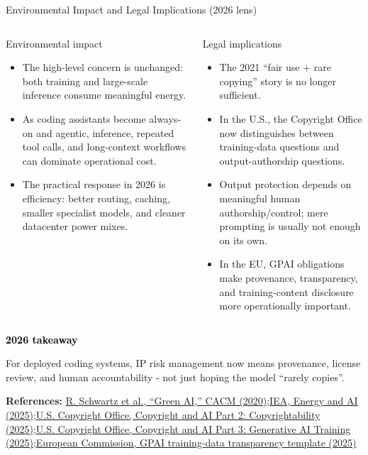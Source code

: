 \documentclass[aspectratio=43,9pt]{beamer}
\newcommand{\srclink}[2]{\href{#2}{\textcolor{black!68}{#1}}}
\newcommand{\sep}{;\hspace{0.35em}}
\newcommand{\refline}[2][References]{%
  \vfill
  {\raggedright\fontsize{5.1}{5.5}\selectfont\color{black!68}\textbf{#1:} #2\par}%
}
\newcommand{\srcSchwartz}{\srclink{R. Schwartz et al., ``Green AI,'' CACM (2020)}{https://arxiv.org/abs/1907.10597}}
\newcommand{\srcIEA}{\srclink{IEA, Energy and AI (2025)}{https://www.iea.org/reports/energy-and-ai/}}
\newcommand{\srcUSCOPTwo}{\srclink{U.S. Copyright Office, Copyright and AI Part 2: Copyrightability (2025)}{https://www.copyright.gov/ai/Copyright-and-Artificial-Intelligence-Part-2-Copyrightability-Report.pdf}}
\newcommand{\srcUSCOPThree}{\srclink{U.S. Copyright Office, Copyright and AI Part 3: Generative AI Training (2025)}{https://www.copyright.gov/ai/Copyright-and-Artificial-Intelligence-Part-3-Generative-AI-Training-Report-Pre-Publication-Version.pdf}}
\newcommand{\srcEUGPAI}{\srclink{European Commission, GPAI training-data transparency template (2025)}{https://digital-strategy.ec.europa.eu/en/news/commission-presents-template-general-purpose-ai-model-providers-summarise-data-used-train-their}}
\begin{document}
\begin{frame}{Environmental Impact and Legal Implications (2026 lens)}
\scriptsize
\begin{columns}[T,totalwidth=\textwidth]
\begin{block}{Environmental impact}
\begin{itemize}
  \item The high-level concern is unchanged: both training and large-scale inference consume meaningful energy.
  \item As coding assistants become always-on and agentic, inference, repeated tool calls, and long-context workflows can dominate operational cost.
  \item The practical response in 2026 is efficiency: better routing, caching, smaller specialist models, and cleaner datacenter power mixes.
\end{itemize}
\end{block}

\begin{block}{Legal implications}
\begin{itemize}
  \item The 2021 ``fair use + rare copying'' story is no longer sufficient.
  \item In the U.S., the Copyright Office now distinguishes between training-data questions and output-authorship questions.
  \item Output protection depends on meaningful human authorship/control; mere prompting is usually not enough on its own.
  \item In the EU, GPAI obligations make provenance, transparency, and training-content disclosure more operationally important.
\end{itemize}
\end{block}
\end{columns}

{\large\textcolor{black}{\textbf{2026 takeaway}}\par}
\vspace{0.15em}
For deployed coding systems, IP risk management now means provenance, license review, and human accountability - not just hoping the model ``rarely copies''.

\refline{\srcSchwartz\sep \srcIEA\sep \srcUSCOPTwo\sep \srcUSCOPThree\sep \srcEUGPAI}
\end{frame}
\end{document}
